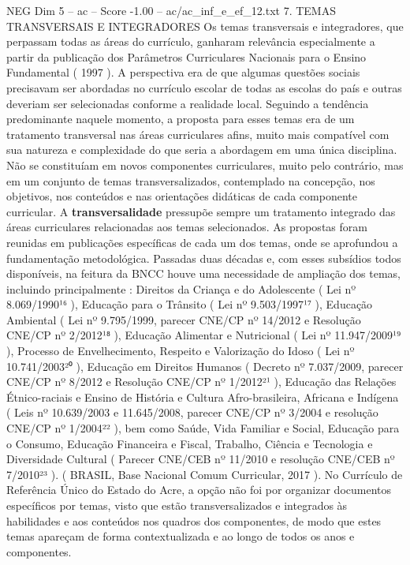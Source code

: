 \begin{textsample}{NEG Dim 5 – ac – Score -1.00 – ac/ac\_inf\_e\_ef\_12.txt}  \label{ex:f5_neg_162}
7.
TEMAS TRANSVERSAIS E INTEGRADORES Os temas transversais e integradores, que perpassam todas as áreas do currículo, ganharam relevância especialmente a partir da publicação dos Parâmetros Curriculares Nacionais para o Ensino Fundamental ( 1997 ).
A perspectiva era de que algumas questões sociais precisavam ser abordadas no currículo escolar de todas as escolas do país e outras deveriam ser selecionadas conforme a realidade local.
Seguindo a tendência predominante naquele momento, a proposta para esses temas era de um tratamento transversal nas áreas curriculares afins, muito mais compatível com sua natureza e complexidade do que seria a abordagem em uma única disciplina.
Não se constituíam em novos componentes curriculares, muito pelo contrário, mas em um conjunto de temas transversalizados, contemplado na concepção, nos objetivos, nos conteúdos e nas orientações didáticas de cada componente curricular.
A \textbf{transversalidade} pressupõe sempre um tratamento integrado das áreas curriculares relacionadas aos temas selecionados.
As propostas foram reunidas em publicações específicas de cada um dos temas, onde se aprofundou a fundamentação metodológica.
Passadas duas décadas e, com esses subsídios todos disponíveis, na feitura da BNCC houve uma necessidade de ampliação dos temas, incluindo principalmente : Direitos da Criança e do Adolescente ( Lei nº 8.069/1990¹⁶ ), Educação para o Trânsito ( Lei nº 9.503/1997¹⁷ ), Educação Ambiental ( Lei nº 9.795/1999, parecer CNE/CP nº 14/2012 e Resolução CNE/CP nº 2/2012¹⁸ ), Educação Alimentar e Nutricional ( Lei nº 11.947/2009¹⁹ ), Processo de Envelhecimento, Respeito e Valorização do Idoso ( Lei nº 10.741/2003²⁰ ), Educação em Direitos Humanos ( Decreto nº 7.037/2009, parecer CNE/CP nº 8/2012 e Resolução CNE/CP nº 1/2012²¹ ), Educação das Relações Étnico-raciais e Ensino de História e Cultura Afro-brasileira, Africana e Indígena ( Leis nº 10.639/2003 e 11.645/2008, parecer CNE/CP nº 3/2004 e resolução CNE/CP nº 1/2004²² ), bem como Saúde, Vida Familiar e Social, Educação para o Consumo, Educação Financeira e Fiscal, Trabalho, Ciência e Tecnologia e Diversidade Cultural ( Parecer CNE/CEB nº 11/2010 e resolução CNE/CEB nº 7/2010²³ ). ( BRASIL, Base Nacional Comum Curricular, 2017 ).
No Currículo de Referência Único do Estado do Acre, a opção não foi por organizar documentos específicos por temas, visto que estão transversalizados e integrados às habilidades e aos conteúdos nos quadros dos componentes, de modo que estes temas apareçam de forma contextualizada e ao longo de todos os anos e componentes.

\end{textsample}
